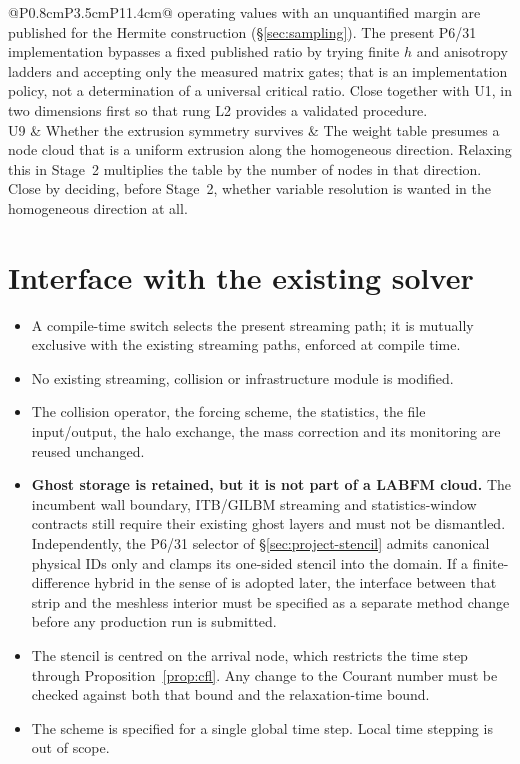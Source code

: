 \documentclass[11pt,a4paper]{article}
\renewcommand{\arraystretch}{1.2}
\newenvironment{widetable}
  {\begingroup\small\setlength{\tabcolsep}{4pt}%
   \renewcommand{\arraystretch}{1.15}%
   \setlength{\LTpre}{0.8em}\setlength{\LTpost}{0.8em}}
  {\endgroup}
\begin{document}
\begin{widetable}
\begin{longtable}{@{}P{0.8cm}P{3.5cm}P{11.4cm}@{}}
operating values with an unquantified margin are published for the Hermite
construction (\S\ref{sec:sampling}). The present P6/31 implementation bypasses a fixed
published ratio by trying finite $h$ and anisotropy ladders and accepting only the
measured matrix gates; that is an implementation policy, not a determination of a
universal critical ratio. Close together with U1, in two dimensions first so that rung
L2 provides a validated procedure. \\
U9 & Whether the extrusion symmetry survives & The weight table presumes a node cloud
that is a uniform extrusion along the homogeneous direction. Relaxing this in Stage~2
multiplies the table by the number of nodes in that direction. Close by deciding, before
Stage~2, whether variable resolution is wanted in the homogeneous direction at all. \
\end{longtable}
\end{widetable}

\section{Interface with the existing solver}

\begin{itemize}
\item A compile-time switch selects the present streaming path; it is mutually
exclusive with the existing streaming paths, enforced at compile time.
\item No existing streaming, collision or infrastructure module is modified.
\item The collision operator, the forcing scheme, the statistics, the file
input/output, the halo exchange, the mass correction and its monitoring are reused
unchanged.
\item \textbf{Ghost storage is retained, but it is not part of a LABFM cloud.}
The incumbent wall boundary, ITB/GILBM streaming and statistics-window contracts still
require their existing ghost layers and must not be dismantled. Independently, the
P6/31 selector of \S\ref{sec:project-stencil} admits canonical physical IDs only and
clamps its one-sided stencil into the domain. If a finite-difference hybrid in the sense
of \cite[Table 1]{KL2021} is adopted later, the interface between that strip and the
meshless interior must be specified as a separate method change before any production
run is submitted.
\item The stencil is centred on the arrival node, which restricts the time step through
Proposition~\ref{prop:cfl}. Any change to the Courant number must be checked against
both that bound and the relaxation-time bound.
\item The scheme is specified for a single global time step. Local time stepping is
out of scope.
\end{itemize}
\end{document}
